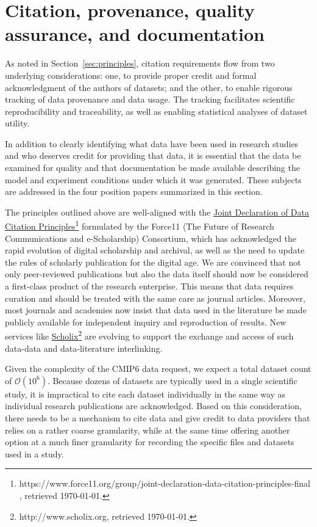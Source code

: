 \documentclass[gmd,manuscript]{copernicus}
\begin{document}
\section{Citation, provenance, quality assurance, and documentation}
\label{sec:cite}

As noted in Section~\ref{sec:principles}, citation requirements flow
from two underlying considerations: one, to provide proper credit and
formal acknowledgment of the authors of datasets; and the other, to
enable rigorous tracking of data provenance and data usage. The
tracking facilitates scientific reproducibility and traceability, as
well as enabling statistical analyses of dataset utility.

In addition to clearly identifying what data have been used in
research studies and who deserves credit for providing that data, it
is essential that the data be examined for quality and that
documentation be made available describing the model and experiment
conditions under which it was generated. These subjects are addressed
in the four position papers summarized in this section.

The principles outlined above are well-aligned with the
\href{https://www.force11.org/group/joint-declaration-data-citation-principles-final
}{Joint Declaration of Data Citation
  Principles}\footnote{https://www.force11.org/group/joint-declaration-data-citation-principles-final
  , retrieved \today.} formulated by the Force11 (The Future of
Research Communications and e-Scholarship) Consortium, which has
acknowledged the rapid evolution of digital scholarship and archival,
as well as the need to update the rules of scholarly publication for
the digital age. We are convinced that not only peer-reviewed
publications but also the data itself should now be considered a
first-class product of the research enterprise. This means that data
requires curation and should be treated with the same care as journal
articles. Moreover, most journals and academies now insist that data
used in the literature be made publicly available for independent
inquiry and reproduction of results. New services like
\href{http://www.scholix.org}{Scholix}\footnote{http://www.scholix.org,
  retrieved \today.} are evolving to support the exchange and access
of such data-data and data-literature interlinking.

Given the complexity of the CMIP6 data request, we expect a total
dataset count of $\mathcal{O}(10^6)$. Because dozens of datasets are
typically used in a single scientific study, it is impractical to cite
each dataset individually in the same way as individual research
publications are acknowledged. Based on this consideration, there
needs to be a mechanism to cite data and give credit to data providers
that relies on a rather coarse granularity, while at the same time
offering another option at a much finer granularity for recording the
specific files and datasets used in a study.
\end{document}
